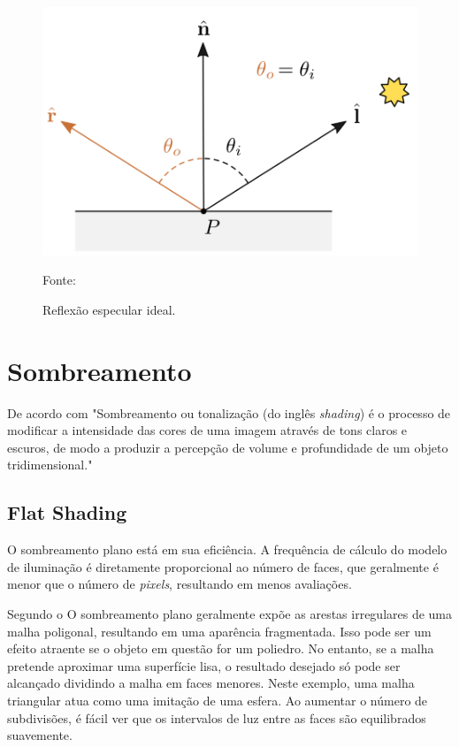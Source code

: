\begin{figure}[ht]
    \caption{Reflexão especular ideal.}
    \centering
    \includegraphics[scale=0.7]{imagens/09_lighting14.png}

    Fonte: \cite{Harlen_Batagelo2021}
    \label{fig:reflexão especular}
\end{figure}

\section{Sombreamento}

De acordo com  "Sombreamento ou tonalização (do inglês \textit{shading}) é o processo de modificar a intensidade das cores de uma imagem através de tons claros e escuros, de modo a produzir a percepção de volume e profundidade de um objeto tridimensional."

\subsection{Flat Shading}

O sombreamento plano está em sua eficiência. A frequência de cálculo do modelo de iluminação é diretamente proporcional ao número de faces, que geralmente é menor que o número de \textit{pixels}, resultando em menos avaliações.

Segundo o  O sombreamento plano geralmente expõe as arestas irregulares de uma malha poligonal, resultando em uma aparência fragmentada. Isso pode ser um efeito atraente se o objeto em questão for um poliedro. No entanto, se a malha pretende aproximar uma superfície lisa, o resultado desejado só pode ser alcançado dividindo a malha em faces menores. Neste exemplo, uma malha triangular atua como uma imitação de uma esfera. Ao aumentar o número de subdivisões, é fácil ver que os intervalos de luz entre as faces são equilibrados suavemente.

